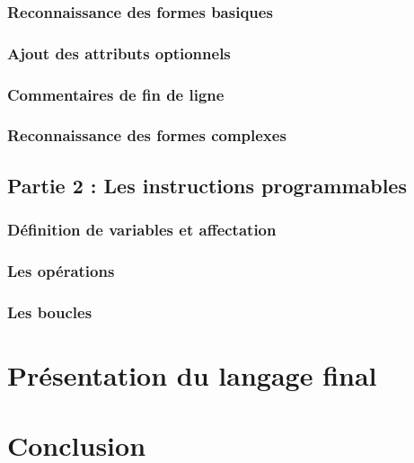 		\subsection{Reconnaissance des formes basiques}

		\subsection{Ajout des attributs optionnels}
	
		\subsection{Commentaires de fin de ligne}
	
		\subsection{Reconnaissance des formes complexes}
	
	\section{Partie 2 : Les instructions programmables}

		\subsection{Définition de variables et affectation}
		
		\subsection{Les opérations}

		\subsection{Les boucles}

\chapter{Présentation du langage final}

\chapter*{Conclusion}


